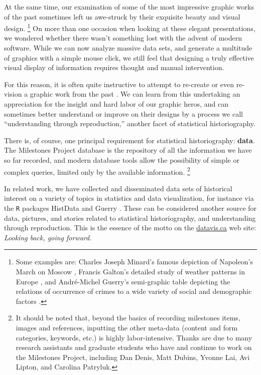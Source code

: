 \documentclass[11pt]{article}
\begin{document}
At the same time, our examination of some of the most impressive graphic works of the past sometimes left us awe-struck by their exquisite beauty and visual design.%
\footnote{Some examples are: Charles Joseph Minard's famous depiction of Napoleon's March on Moscow \citep{Friendly:02:Minard}, Francis Galton's detailed study of weather patterns in Europe \citep[see:][]{Friendly:2008:golden}, and Andr{\'e}-Michel Guerry's \citep[Plate 17]{Guerry:1864} semi-graphic table depicting the relations of occurrence of crimes to a wide variety of social and demographic factors \citep[see:][]{Friendly:2007:guerry}.}
On more than one occasion when looking at these elegant presentations, we wondered whether there wasn't something lost with the advent of modern software. While we can now analyze massive data sets, and generate a multitude of graphics with a simple mouse click, we still feel that designing a truly effective visual display of information requires thought and manual intervention. 

For this reason, it is often quite instructive to attempt to re-create or even re-vision a graphic work from the past \citep{Friendly:02:Minard}. We can learn from this undertaking an appreciation for the insight and hard labor of our graphic heros, and can sometimes better understand or improve on their designs by a process we call ``understanding through reproduction,'' another facet of statistical historiography.

There is, of course,  one principal requirement for statistical historiography: \textbf{data}. The Milestones Project database is the repository of all the information we have so far recorded, and modern database tools allow the possibility of simple or complex queries, limited only by the available information.%
\footnote{It should be noted that, beyond the basics of recording milestones items, images and references, inputting the other meta-data (content and form categories, keywords, etc.) is highly labor-intensive. Thanks are due to many research assistants and graduate students who have and continue to work on the Milestones Project, including Dan Denis, Matt Dubins, Yvonne Lai, Avi Lipton, and Carolina Patryluk.}

In related work, we have collected and disseminated data sets of historical interest on a variety of topics in statistics and data visualization, for instance via the \texttt{R} packages HistData \citep{HistData} and Guerry \citep{Guerry}. These can be considered another source for data, pictures, and stories related to statistical historiography, and understanding through reproduction. This is the essence of the motto on the \url{datavis.ca} web site: \emph{Looking back, going forward}.
\end{document}

